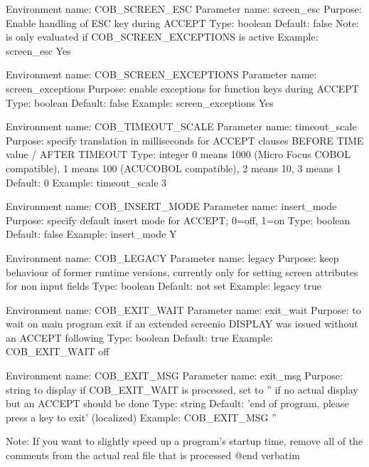Environment name:  COB_SCREEN_ESC
  Parameter name:  screen_esc
         Purpose:  Enable handling of ESC key during ACCEPT
            Type:  boolean
         Default:  false
            Note:  is only evaluated if COB_SCREEN_EXCEPTIONS is active
         Example:  screen_esc Yes

Environment name:  COB_SCREEN_EXCEPTIONS
  Parameter name:  screen_exceptions
         Purpose:  enable exceptions for function keys during ACCEPT
            Type:  boolean
         Default:  false
         Example:  screen_exceptions Yes

Environment name:  COB_TIMEOUT_SCALE
  Parameter name:  timeout_scale
         Purpose:  specify translation in milliseconds for ACCEPT clauses
                   BEFORE TIME value / AFTER TIMEOUT
            Type:  integer
                   0 means 1000 (Micro Focus COBOL compatible), 1 means 100
                   (ACUCOBOL compatible), 2 means 10, 3 means 1
         Default:  0
         Example:  timeout_scale 3

Environment name:  COB_INSERT_MODE
  Parameter name:  insert_mode
         Purpose:  specify default insert mode for ACCEPT; 0=off, 1=on
            Type:  boolean
         Default:  false
         Example:  insert_mode Y

Environment name:  COB_LEGACY
  Parameter name:  legacy
         Purpose:  keep behaviour of former runtime versions, currently only
                   for setting screen attributes for non input fields
            Type:  boolean
         Default:  not set
         Example:  legacy true

Environment name:  COB_EXIT_WAIT
  Parameter name:  exit_wait
         Purpose:  to wait on main program exit if an extended screenio
                   DISPLAY was issued without an ACCEPT following
            Type:  boolean
         Default:  true
         Example:  COB_EXIT_WAIT off

Environment name:  COB_EXIT_MSG
  Parameter name:  exit_msg
         Purpose:  string to display if COB_EXIT_WAIT is processed, set to ''
                   if no actual display but an ACCEPT should be done
            Type:  string
         Default:  'end of program, please press a key to exit' (localized)
         Example:  COB_EXIT_MSG ''

Note: If you want to slightly speed up a program's startup time, remove all
      of the comments from the actual real file that is processed
@end verbatim

